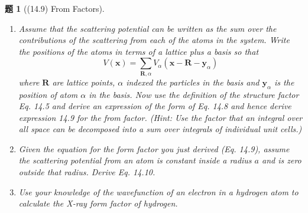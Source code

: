 \documentclass[UTF8,10pt,a4paper]{article}
\theoremstyle{Problem}
\newtheorem{prob}{题}
\theoremstyle{Solution}
\begin{document}
\begin{prob}[(14.9) From Factors]
    \begin{enumerate}
        \item[(a)] Assume that the scattering potential can be written as the sum over the contributions of the scattering from each of the atoms in the system. Write the positions of the atoms in terms of a lattice plus a basis so that
        \[
            V(\bm{x})=\sum_{\bm{R},\alpha}V_{\alpha}(\bm{x}-\bm{R}-\bm{y}_{\alpha})
        \]
        where $\bm{R}$ are lattice points, $\alpha$ indexed the particles in the basis and $\bm{y}_{\alpha}$ is the position of atom $\alpha$ in the basis. Now use the definition of the structure factor Eq. 14.5 and derive an expression of the form of Eq. 14.8 and hence derive expression 14.9 for the from factor. (Hint: Use the factor that an integral over all space can be decomposed into a sum over integrals of individual unit cells.)
        \item[(b)] Given the equation for the form factor you just derived (Eq. 14.9), assume the scattering potential from an atom is constant inside a radius $a$ and is zero outside that radius. Derive Eq. 14.10.
        \item[(c)$^*$] Use your knowledge of the wavefunction of an electron in a hydrogen atom to calculate the X-ray form factor of hydrogen.
    \end{enumerate}
\end{prob}
\end{document}
